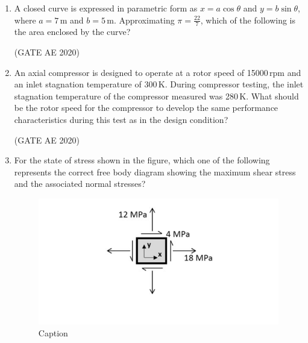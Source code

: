 \documentclass[journal,12pt,onecolumn]{IEEEtran}
\theoremstyle{remark}
\begin{document}
\begin{enumerate}
\item A closed curve is expressed in parametric form as $x = a \cos \theta$ and $y = b \sin \theta$, where $a = 7$\,m and $b = 5$\,m. Approximating $\pi = \frac{22}{7}$, which of the following is the area enclosed by the curve?
\begin{enumerate}
\end{enumerate}
\hfill(GATE AE 2020)

\item An axial compressor is designed to operate at a rotor speed of 15000\,rpm and an inlet stagnation temperature of 300\,K. During compressor testing, the inlet stagnation temperature of the compressor measured was 280\,K. What should be the rotor speed for the compressor to develop the same performance characteristics during this test as in the design condition?
\begin{enumerate}
\end{enumerate}
\hfill(GATE AE 2020)

\item For the state of stress shown in the figure, which one of the following represents the correct free body diagram showing the maximum shear stress and the associated normal stresses?

\begin{figure}[H]
    \centering
    \includegraphics[width=0.5\columnwidth]{figs/Screenshot from 2025-08-19 15-40-59.png}
    \caption{Caption}
    \label{fig:placeholder}
\end{figure}


\end{enumerate}
\end{document}
